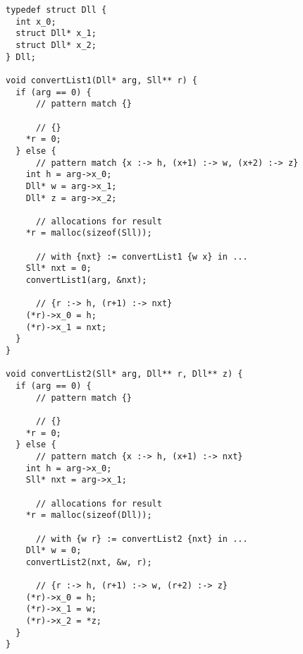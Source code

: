 \begin{lstlisting}
typedef struct Dll {
  int x_0;
  struct Dll* x_1;
  struct Dll* x_2;
} Dll;

void convertList1(Dll* arg, Sll** r) {
  if (arg == 0) {
      // pattern match {}

      // {}
    *r = 0;
  } else {
      // pattern match {x :-> h, (x+1) :-> w, (x+2) :-> z}
    int h = arg->x_0;
    Dll* w = arg->x_1;
    Dll* z = arg->x_2;

      // allocations for result
    *r = malloc(sizeof(Sll));

      // with {nxt} := convertList1 {w x} in ...
    Sll* nxt = 0;
    convertList1(arg, &nxt);

      // {r :-> h, (r+1) :-> nxt}
    (*r)->x_0 = h;
    (*r)->x_1 = nxt;
  }
}

void convertList2(Sll* arg, Dll** r, Dll** z) {
  if (arg == 0) {
      // pattern match {}

      // {}
    *r = 0;
  } else {
      // pattern match {x :-> h, (x+1) :-> nxt}
    int h = arg->x_0;
    Sll* nxt = arg->x_1;

      // allocations for result
    *r = malloc(sizeof(Dll));

      // with {w r} := convertList2 {nxt} in ...
    Dll* w = 0;
    convertList2(nxt, &w, r);

      // {r :-> h, (r+1) :-> w, (r+2) :-> z}
    (*r)->x_0 = h;
    (*r)->x_1 = w;
    (*r)->x_2 = *z;
  }
}
\end{lstlisting}

